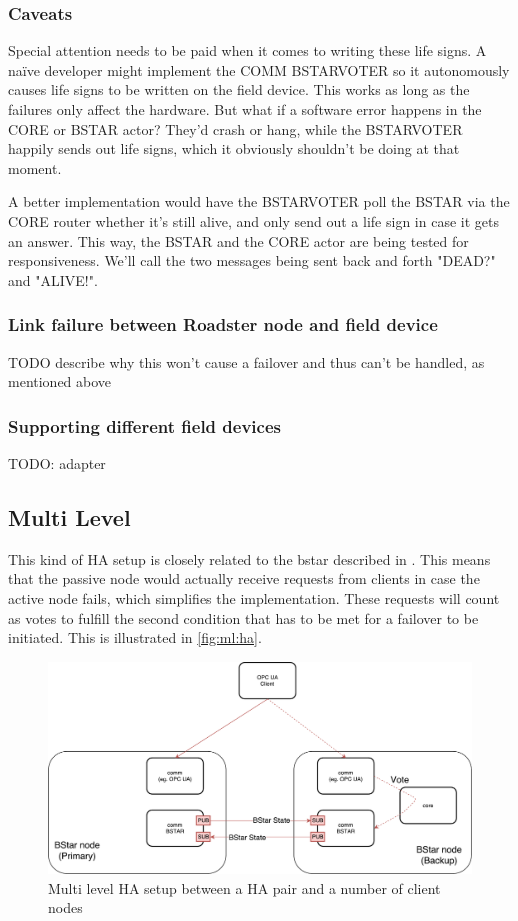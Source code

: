 \subsubsection{Caveats}
Special attention needs to be paid when it comes to writing these life signs. A
na\"ive developer might implement the COMM BSTARVOTER so it autonomously causes
life signs to be written on the field device. This works as long as the failures only affect
the hardware. But what if a software error happens in the CORE or BSTAR actor?
They'd crash or hang, while the BSTARVOTER happily sends out life signs, which it
obviously shouldn't be doing at that moment.

A better implementation would have the BSTARVOTER poll the BSTAR via the CORE
router whether it's still alive, and only send out a life sign in case it gets
an answer. This way, the BSTAR and the CORE actor are being tested for
responsiveness. We'll call the two messages being sent back and forth "DEAD?"
and "ALIVE!".

\subsubsection{Link failure between Roadster node and field device}
TODO describe why this won't cause a failover and thus can't be handled, as
mentioned above\\

\subsubsection{Supporting different field devices}
TODO: adapter

\subsection{Multi Level}
This kind of \gls{HA} setup is closely related to the \gls{bstar} described
in \cite[Chapter 4 - Reliable Request-Reply Patterns, High-Availability Pair
(Binary Star Pattern)]{zmq:zguide}. This means that the passive node would
actually receive requests from clients in case the active node fails, which
simplifies the implementation. These requests will count as votes to fulfill
the second condition that has to be met for a failover to be initiated. This is
illustrated in \autoref{fig:ml:ha}.

\begin{figure}[]
	\includegraphics[width=\textwidth]{img/ML-HA_bstar.pdf}
	\caption{Multi level HA setup between a HA pair and a number of client nodes}
	\label{fig:ml:ha}
\end{figure}

